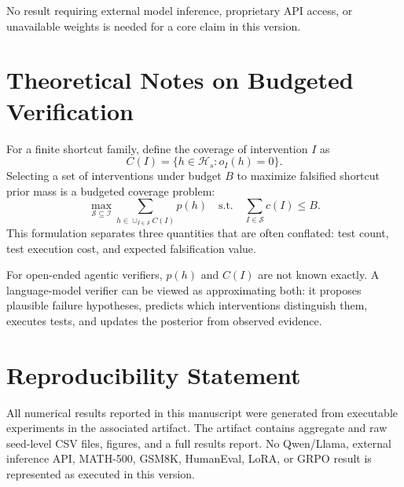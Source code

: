 \documentclass[10pt]{article}
\begin{document}
No result requiring external model inference, proprietary API access, or unavailable weights is needed for a core claim in this version.

\section{Theoretical Notes on Budgeted Verification}

For a finite shortcut family, define the coverage of intervention $I$ as
\[
C(I)=\{h\in\mathcal{H}_s:o_I(h)=0\}.
\]
Selecting a set of interventions under budget $B$ to maximize falsified shortcut prior mass is a budgeted coverage problem:
\[
\max_{\mathcal{S}\subseteq\mathcal{I}}
\sum_{h\in \cup_{I\in\mathcal{S}} C(I)}p(h)
\quad
\text{s.t.}
\quad
\sum_{I\in\mathcal{S}}c(I)\le B.
\]
This formulation separates three quantities that are often conflated: test count, test execution cost, and expected falsification value.

For open-ended agentic verifiers, $p(h)$ and $C(I)$ are not known exactly. A language-model verifier can be viewed as approximating both: it proposes plausible failure hypotheses, predicts which interventions distinguish them, executes tests, and updates the posterior from observed evidence.

\section{Reproducibility Statement}

All numerical results reported in this manuscript were generated from executable experiments in the associated artifact. The artifact contains aggregate and raw seed-level CSV files, figures, and a full results report. No Qwen/Llama, external inference API, MATH-500, GSM8K, HumanEval, LoRA, or GRPO result is represented as executed in this version.
\end{document}

